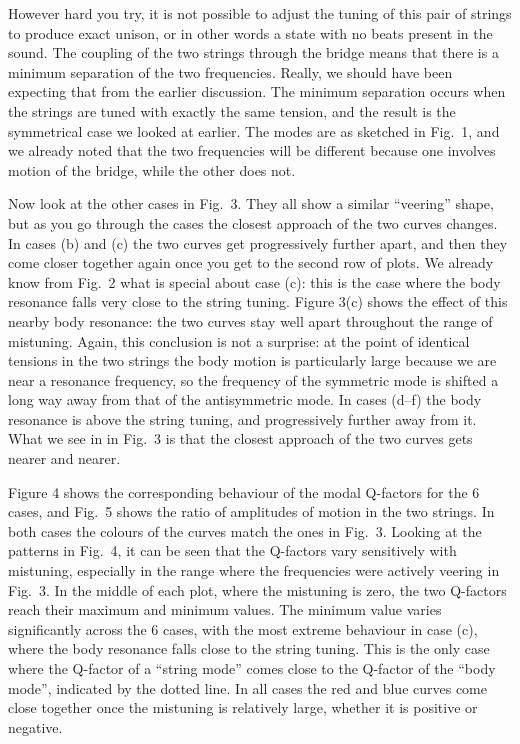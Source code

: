   However hard you try, it is not possible to adjust the tuning of this pair of 
  strings to produce exact unison, or in other words a state with no beats 
  present in the sound. The coupling of the two strings through the bridge 
  means that there is a minimum separation of the two frequencies. Really, we 
  should have been expecting that from the earlier discussion. The minimum 
  separation occurs when the strings are tuned with exactly the same tension, 
  and the result is the symmetrical case we looked at earlier. The modes are as 
  sketched in Fig.\ 1, and we already noted that the two frequencies will be 
  different because one involves motion of the bridge, while the other does 
  not. 

  Now look at the other cases in Fig.\ 3. They all show a similar ``veering'' 
  shape, but as you go through the cases the closest approach of the two curves 
  changes. In cases (b) and (c) the two curves get progressively further apart, 
  and then they come closer together again once you get to the second row of 
  plots. We already know from Fig.\ 2 what is special about case (c): this is 
  the case where the body resonance falls very close to the string tuning. 
  Figure 3(c) shows the effect of this nearby body resonance: the two curves 
  stay well apart throughout the range of mistuning. Again, this conclusion is 
  not a surprise: at the point of identical tensions in the two strings the 
  body motion is particularly large because we are near a resonance frequency, 
  so the frequency of the symmetric mode is shifted a long way away from that 
  of the antisymmetric mode. In cases (d--f) the body resonance is above the 
  string tuning, and progressively further away from it. What we see in in 
  Fig.\ 3 is that the closest approach of the two curves gets nearer and 
  nearer. 

  Figure 4 shows the corresponding behaviour of the modal Q-factors for the 6 
  cases, and Fig.\ 5 shows the ratio of amplitudes of motion in the two 
  strings. In both cases the colours of the curves match the ones in Fig.\ 3. 
  Looking at the patterns in Fig.\ 4, it can be seen that the Q-factors vary 
  sensitively with mistuning, especially in the range where the frequencies 
  were actively veering in Fig.\ 3. In the middle of each plot, where the 
  mistuning is zero, the two Q-factors reach their maximum and minimum values. 
  The minimum value varies significantly across the 6 cases, with the most 
  extreme behaviour in case (c), where the body resonance falls close to the 
  string tuning. This is the only case where the Q-factor of a ``string mode'' 
  comes close to the Q-factor of the ``body mode'', indicated by the dotted 
  line. In all cases the red and blue curves come close together once the 
  mistuning is relatively large, whether it is positive or negative. 

